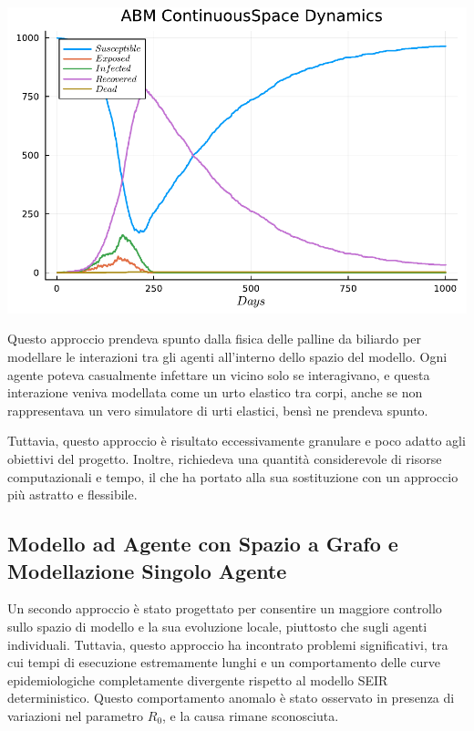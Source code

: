 \begin{minipage}{\linewidth}
    \centering
    \includegraphics[width=\textwidth]{img/plot_abm_continuousspace.pdf}
    \label{fig:seir_curve_continuous}
\end{minipage}

Questo approccio prendeva spunto dalla fisica delle palline da 
biliardo per modellare le interazioni tra gli agenti all'interno 
dello spazio del modello. Ogni agente poteva casualmente infettare 
un vicino solo se interagivano, e questa interazione veniva modellata 
come un urto elastico tra corpi, anche se non rappresentava un vero 
simulatore di urti elastici, bensì ne prendeva spunto.

Tuttavia, questo approccio è risultato eccessivamente granulare e 
poco adatto agli obiettivi del progetto. Inoltre, richiedeva una 
quantità considerevole di risorse computazionali e tempo, il che 
ha portato alla sua sostituzione con un approccio più astratto e flessibile.
\newpage

\subsection{Modello ad Agente con Spazio a Grafo e Modellazione Singolo Agente}

Un secondo approccio è stato progettato per consentire un maggiore 
controllo sullo spazio di modello e la sua evoluzione locale, 
piuttosto che sugli agenti individuali. Tuttavia, questo approccio 
ha incontrato problemi significativi, tra cui tempi di esecuzione 
estremamente lunghi e un comportamento delle curve epidemiologiche 
completamente divergente rispetto al modello SEIR deterministico. 
Questo comportamento anomalo è stato osservato in presenza di variazioni 
nel parametro $R_0$, e la causa rimane sconosciuta.


